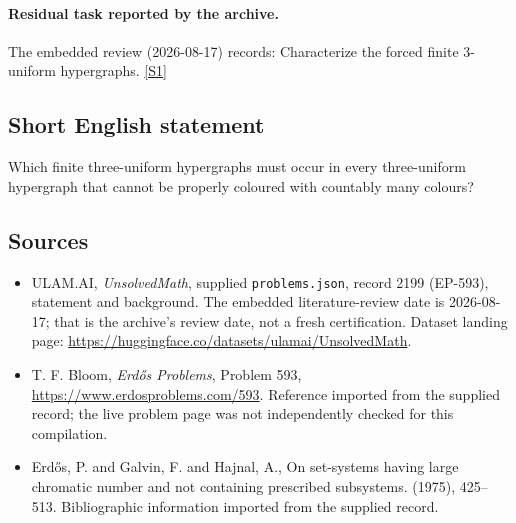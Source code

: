 \documentclass[11pt,a4paper]{article}
\newcommand{\sref}[2]{\hyperlink{source:#1:#2}{[S#2]}}
\begin{document}
\paragraph{Residual task reported by the archive.}

The embedded review (2026-08-17) records: Characterize the forced finite 3-uniform hypergraphs. \sref{2199}{1}

\subsection{Short English statement}

Which finite three-uniform hypergraphs must occur in every three-uniform hypergraph that cannot be properly coloured with countably many colours?

\subsection{Sources}

{\small

\begin{itemize}

\item[\hypertarget{source:2199:1}{S1}] ULAM.AI, \emph{UnsolvedMath}, supplied \texttt{problems.json}, record 2199 (EP-593), statement and background. The embedded literature-review date is 2026-08-17; that is the archive’s review date, not a fresh certification. Dataset landing page: \url{https://huggingface.co/datasets/ulamai/UnsolvedMath}.

\item[\hypertarget{source:2199:2}{S2}] T. F. Bloom, \emph{Erdős Problems}, Problem 593, \url{https://www.erdosproblems.com/593}. Reference imported from the supplied record; the live problem page was not independently checked for this compilation.

\item[\hypertarget{source:2199:3}{S3}] Erd\H{o}s, P. and Galvin, F. and Hajnal, A., On set-systems having large chromatic number and not containing prescribed subsystems. (1975), 425--513. Bibliographic information imported from the supplied record.

\end{itemize}

}

\label{end:2199}
\end{document}
